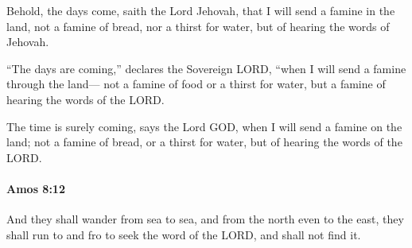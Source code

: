 			\begin{versebox}
					\item[BHS] 
					\item[LXX] 
					\item[ASV] Behold, the days come, saith the Lord Jehovah, that I will send a famine in the land, not a famine of bread, nor a thirst for water, but of hearing the words of Jehovah.
					\item[NIV] “The days are coming,” declares the Sovereign LORD, “when I will send a famine through the land— not a famine of food or a thirst for water, but a famine of hearing the words of the LORD.
					\item[NRSV] The time is surely coming, says the Lord GOD, when I will send a famine on the land; not a famine of bread, or a thirst for water, but of hearing the words of the LORD.
			\end{versebox}

		\paragraph{Amos 8:12} %
			\label{AMOS-8-12}

			And they shall wander from sea to sea, and from the north even to the east, they shall run to and fro to seek the word of the LORD, and shall not find it.

